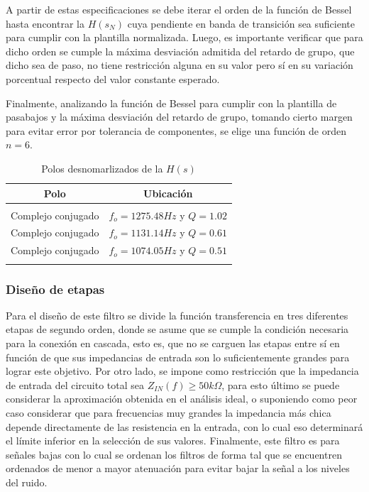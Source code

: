 A partir de estas especificaciones se debe iterar el orden de la funci\'on de Bessel hasta encontrar la $H(s_N)$ cuya pendiente en banda de transici\'on sea suficiente para cumplir con la plantilla
normalizada. Luego, es importante verificar que para dicho orden se cumple la m\'axima desviaci\'on admitida del retardo de grupo, que dicho sea de paso, no tiene restricci\'on alguna en su valor pero s\'i
en su variaci\'on porcentual respecto del valor constante esperado.


Finalmente, analizando la funci\'on de Bessel para cumplir con la plantilla de pasabajos y la m\'axima desviaci\'on del retardo de grupo, tomando cierto margen para evitar error por tolerancia de componentes,
se elige una funci\'on de orden $n = 6$.

\begin{table}[H]
    \centering
    \begin{tabular}{c | c}
        Polo & Ubicaci\'on \\
        \hline \\
        Complejo conjugado & $f_o = 1275.48Hz$ y $Q = 1.02$\\
        Complejo conjugado & $f_o = 1131.14Hz$ y $Q = 0.61$\\
        Complejo conjugado & $f_o = 1074.05Hz$ y $Q = 0.51$\\
        \\ \hline
    \end{tabular}
    \caption{Polos desnomarlizados de la $H(s)$}
\end{table}

\subsubsection{Dise\~no de etapas}
Para el dise\~no de este filtro se divide la funci\'on transferencia en tres diferentes etapas de segundo orden, donde se asume que se cumple la condici\'on necesaria para la conexi\'on en cascada,
esto es, que no se carguen las etapas entre s\'i en funci\'on de que sus impedancias de entrada son lo suficientemente grandes para lograr este objetivo. Por otro lado, se impone como restricci\'on que la impedancia de entrada
del circuito total sea $Z_{IN}(f) \geq 50k \Omega$, para esto \'ultimo se puede considerar la aproximaci\'on obtenida en el an\'alisis ideal, o suponiendo como peor caso considerar que para frecuencias muy grandes la impedancia m\'as chica
depende directamente de las resistencia en la entrada, con lo cual eso determinar\'a el l\'imite inferior en la selecci\'on de sus valores. Finalmente, este filtro es para se\~nales bajas con lo cual se ordenan los filtros de forma tal que se encuentren ordenados
de menor a mayor atenuaci\'on para evitar bajar la se\~nal a los niveles del ruido.

